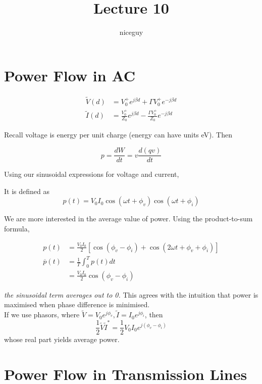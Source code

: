 \documentclass[12pt]{article}
\title{Lecture 10}
\author{niceguy}
\begin{document}
\maketitle

\section{Power Flow in AC}

\begin{align*}
    \tilde V(d) &= V_0^+ e^{j\beta d} + \Gamma V_0^+ e^{-j\beta d} \\
    \tilde I(d) &= \frac{V_0^+}{Z_0} e^{j\beta d} - \frac{\Gamma V_0^+}{Z_0} e^{-j\beta d}
\end{align*}

Recall voltage is energy per unit charge (energy can have units eV). Then

$$p = \frac{dW}{dt} = v\frac{d(qv)}{dt}$$

Using our sinusoidal expressions for voltage and current,

\begin{defn}
    It is defined as
    $$p(t) = V_0I_0\cos(\omega t + \phi_v)\cos(\omega t + \phi_i)$$
\end{defn}

We are more interested in the average value of power. Using the product-to-sum formula,

\begin{align*}
    p(t) &= \frac{V_0I_0}{2} \left[\cos(\phi_v - \phi_i) + \cos(2\omega t + \phi_v + \phi_i)\right] \\
    \overline p(t) &= \frac{1}{T} \int_0^T p(t)dt \\
                   &= \frac{V_0I_0}{2} \cos(\phi_v - \phi_i)
\end{align*}

\textit{the sinusoidal term averages out to 0.} This agrees with the intuition that power is maximised when phase difference is minimised. \\
If we use phasors, where $\tilde V = V_0 e^{j\phi_v}, \tilde I = I_0 e^{j\phi_i}$, then
$$\frac{1}{2} \tilde V \tilde I^* = \frac{1}{2} V_0I_0 e^{j(\phi_v - \phi_i)}$$
whose real part yields average power.

\section{Power Flow in Transmission Lines}
\end{document}
